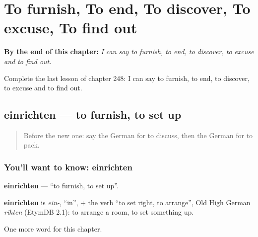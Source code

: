 
\chapter{To furnish, To end, To discover, To excuse, To find out}
\label{ch:ge-to-furnish-to-end-to-discover-to-excuse-to-find-out}

\begin{chapteropening}
\textbf{By the end of this chapter:} \emph{I can say to furnish, to end, to discover, to excuse and to find out.}

Complete the last lesson of chapter 248: I can say to furnish, to end, to discover, to excuse and to find out.
\end{chapteropening}

\section[einrichten]{einrichten — to furnish, to set up}

\label{lesson:GE-C248-einrichten}



\begin{quote}
Before the new one: say the German for to discuss, then the German for to pack.
\end{quote}

\subsection*{You'll want to know: einrichten}
\textbf{einrichten} — \textquotedblleft{}to furnish, to set up\textquotedblright{}.

\begin{cousinweb}
\textbf{einrichten} is \emph{ein-}, \textquotedblleft{}in\textquotedblright{}, + the verb \textquotedblleft{}to set right, to arrange\textquotedblright{}, Old High German \emph{rihten} (EtymDB 2.1): to arrange a room, to set something up.
\end{cousinweb}

\begin{grammarlens}[title={What you've built}]
One more word for this chapter.
\end{grammarlens}

